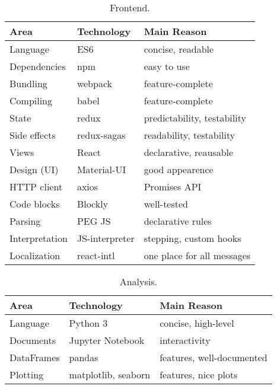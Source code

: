 \begin{table}[htb]
\centering
\caption{Frontend.}
\begin{tabular}{l l l}
\toprule
Area & Technology & Main Reason  \\
\midrule
Language & ES6 & concise, readable \\
Dependencies & npm & easy to use \\
Bundling & webpack & feature-complete \\ %
Compiling & babel & feature-complete \\ %
State & redux  & predictability, testability \\  %
Side effects & redux-sagas  & readability, testability \\
Views & React & declarative, reausable \\
Design (UI) & Material-UI & good appearence \\
HTTP client & axios & Promises API\\
Code blocks & Blockly & well-tested \\
Parsing & PEG JS & declarative rules \\  %
Interpretation & JS-interpreter & stepping, custom hooks \\
Localization & react-intl & one place for all messages \\
\bottomrule
\end{tabular}
\end{table}

\begin{table}[htb]
\centering
\caption{Analysis.}
\begin{tabular}{l l l}
\toprule
Area & Technology & Main Reason  \\
\midrule
Language & Python 3 & concise, high-level \\
Documents & Jupyter Notebook & interactivity \\
DataFrames & pandas & features, well-documented \\
Plotting & matplotlib, seaborn & features, nice plots \\
\bottomrule
\end{tabular}
\end{table}
